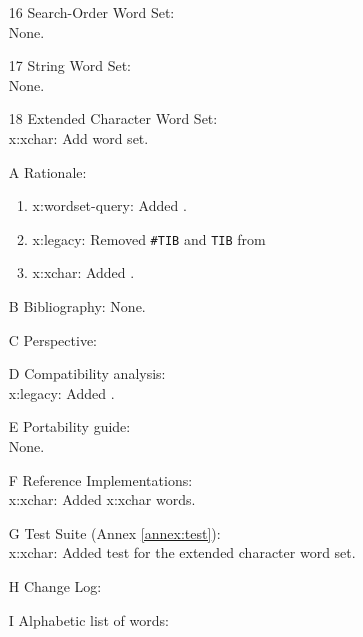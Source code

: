 \begin{itemize}
	\item[16] Search-Order Word Set: \\
		None.

	\item[17] String Word Set: \\
		None.

	\item[18] Extended Character Word Set: \\
		\textsf{x:xchar}: Add word set.

	\item[A] Rationale:								%
		\begin{enumerate}
		\item \textsf{x:wordset-query}: Added .
		\item \textsf{x:legacy}: Removed \texttt{\#TIB} and \texttt{TIB} from
		\item \textsf{x:xchar}: Added .
		\end{enumerate}

	\item[B] Bibliography:							%
		None.

	\item[C] Perspective:							%
	\item[D] Compatibility analysis: \\			%
		\textsf{x:legacy}: Added .

	\item[E] Portability guide: \\				%
		None.

	\item[F] Reference Implementations: \\		%
		\textsf{x:xchar}: Added \textsf{x:xchar} words.

	\item[G] Test Suite (Annex \ref{annex:test}): \\
		\textsf{x:xchar}: Added test for the extended character word set.

	\item[H] Change Log:								%
	\item[I] Alphabetic list of words:			%
	\end{itemize}

\endinput

